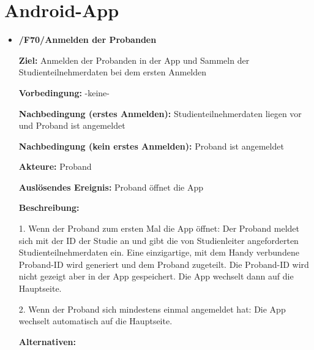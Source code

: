 \documentclass[a4paper]{scrreprt}
\begin{document}
        \newpage
        \section{Android-App}

            \begin{itemize}
                \item \textbf{/F70/Anmelden der \gls{Proband}en}

                    \par \textbf{Ziel: }Anmelden der \gls{Proband}en in der App und Sammeln der Studienteilnehmerdaten bei dem ersten Anmelden
                    \par \textbf{Vorbedingung: }-keine-
                    \par \textbf{Nachbedingung (erstes Anmelden): }Studienteilnehmerdaten liegen vor und \gls{Proband} ist angemeldet
                    \par \textbf{Nachbedingung (kein erstes Anmelden): }\gls{Proband} ist angemeldet
                    \par \textbf{Akteure: }\gls{Proband}
                    \par \textbf{Auslösendes Ereignis: }\gls{Proband} öffnet die App
                    \par \textbf{Beschreibung: }
                    \par 1. Wenn der \gls{Proband} zum ersten Mal die App öffnet: Der \gls{Proband} meldet sich mit der ID der Studie an und gibt die von \gls{Studienleiter} angeforderten Studienteilnehmerdaten ein. Eine einzigartige, mit dem Handy verbundene \gls{Proband}-ID wird generiert und dem \gls{Proband} zugeteilt. Die \gls{Proband}-ID wird nicht gezeigt aber in der App gespeichert. Die App wechselt dann auf die Hauptseite.
                    \par 2. Wenn der \gls{Proband} sich mindestens einmal angemeldet hat: Die App wechselt automatisch auf die Hauptseite.
                    \par \textbf{Alternativen: }
                    \begin{figure}[ht]
                        \centering

\end{figure}
\end{itemize}
\end{document}
